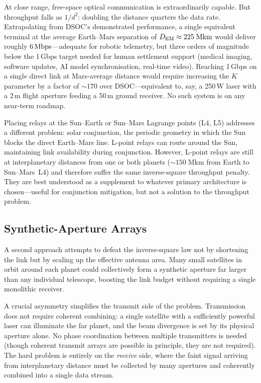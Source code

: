 At close range, free-space optical communication is extraordinarily
capable. But throughput falls as $1/d^2$: doubling the distance quarters the
data rate. Extrapolating from DSOC's demonstrated performance, a single
equivalent terminal at the average Earth--Mars separation of $D_{\mathrm{EM}} \approx
225\;\text{Mkm}$ would deliver roughly $6\,\text{Mbps}$---adequate for robotic
telemetry, but three orders of magnitude below the 1\,Gbps target needed for
human settlement support (medical imaging, software updates, AI model
synchronisation, real-time video). Reaching 1\,Gbps on a single direct link at
Mars-average distance would require increasing the $K$ parameter by a factor of
$\sim\!170$ over DSOC---equivalent to, say, a 250\,W laser with a 2\,m flight
aperture feeding a 50\,m ground receiver. No such system is on any near-term
roadmap.

Placing relays at the Sun--Earth or Sun--Mars Lagrange points (L4, L5) addresses
a different problem: solar conjunction, the periodic geometry in which the Sun
blocks the direct Earth--Mars line. L-point relays can route around the Sun,
maintaining link availability during conjunction. However, L-point relays are
still at interplanetary distances from one or both planets ($\sim\!150\;\text{Mkm}$
from Earth to Sun--Mars~L4) and therefore suffer the same inverse-square
throughput penalty. They are best understood as a supplement to whatever primary
architecture is chosen---useful for conjunction mitigation, but not a solution to
the throughput problem.


\subsection{Synthetic-Aperture Arrays}
\label{sec:synthetic-aperture}

A second approach attempts to defeat the inverse-square law not by shortening the
link but by scaling up the effective antenna area. Many small satellites in orbit
around each planet could collectively form a synthetic aperture far larger than
any individual telescope, boosting the link budget without requiring a single
monolithic receiver.

A crucial asymmetry simplifies the transmit side of the problem. Transmission
does not require coherent combining: a single satellite with a sufficiently
powerful laser can illuminate the far planet, and the beam divergence is set by
its physical aperture alone. No phase coordination between multiple transmitters
is needed (though coherent transmit arrays are possible in principle, they are
not required). The hard problem is entirely on the \emph{receive} side, where
the faint signal arriving from interplanetary distance must be collected by many
apertures and coherently combined into a single data stream.

